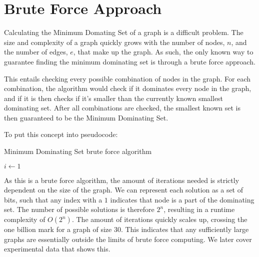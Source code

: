 \documentclass[paper.tex]{subfiles}
\begin{document}
\section{Brute Force Approach}

Calculating the Minimum Domating Set of a graph is a difficult problem.
The size and complexity of a graph quickly grows with the number of nodes, $n$, and the number of edges, $e$, that make up the graph.
As such, the only known way to guarantee finding the minimum dominating set is through a brute force approach.

This entails checking every possible combination of nodes in the graph.
For each combination, the algorithm would check if it dominates every node in the graph, and if it is then checks if it's smaller than the currently known smallest dominating set.
After all combinations are checked, the smallest known set is then guaranteed to be the Minimum Dominating Set.

To put this concept into pseudocode:

\begin{algorithm}[H]

    \caption{Minimum Dominating Set brute force algorithm}

    \begin{algorithmic}[1]
            \State $i \gets 1$
                    \EndFor
                \EndFor
                    \EndIf
                \EndIf
            \EndWhile
        \EndProcedure

    \end{algorithmic}

\end{algorithm}

As this is a brute force algorithm, the amount of iterations needed is strictly dependent on the size of the graph.
We can represent each solution as a set of bits, such that any index with a $1$ indicates that node is a part of the dominating set.
The number of possible solutions is therefore $2^n$, resulting in a runtime complexity of $O(2^n)$.
The amount of iterations quickly scales up, crossing the one billion mark for a graph of size 30.
This indicates that any sufficiently large graphs are essentially outside the limits of brute force computing.
We later cover experimental data that shows this.
\end{document}
